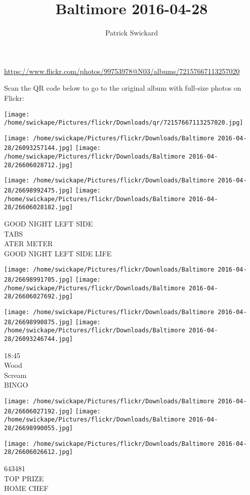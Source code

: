 \documentclass[10pt,letterpaper]{article}
\title{Baltimore 2016-04-28}
\author{Patrick Swickard}
\date{}
\begin{document}
\maketitle

\url{https://www.flickr.com/photos/99753978@N03/albums/72157667113257020}

Scan the QR code below to go to the original album with full-size photos on Flickr:

\texttt{[image: /home/swickape/Pictures/flickr/Downloads/qr/72157667113257020.jpg]}
\pagebreak

\texttt{[image: /home/swickape/Pictures/flickr/Downloads/Baltimore 2016-04-28/26093257144.jpg]}
\texttt{[image: /home/swickape/Pictures/flickr/Downloads/Baltimore 2016-04-28/26606028712.jpg]}

\texttt{[image: /home/swickape/Pictures/flickr/Downloads/Baltimore 2016-04-28/26698992475.jpg]}
\texttt{[image: /home/swickape/Pictures/flickr/Downloads/Baltimore 2016-04-28/26606028182.jpg]}

GOOD NIGHT LEFT SIDE\\
TABS\\
ATER METER\\
GOOD NIGHT LEFT SIDE LIFE
\pagebreak

\texttt{[image: /home/swickape/Pictures/flickr/Downloads/Baltimore 2016-04-28/26698991705.jpg]}
\texttt{[image: /home/swickape/Pictures/flickr/Downloads/Baltimore 2016-04-28/26606027692.jpg]}

\texttt{[image: /home/swickape/Pictures/flickr/Downloads/Baltimore 2016-04-28/26698990875.jpg]}
\texttt{[image: /home/swickape/Pictures/flickr/Downloads/Baltimore 2016-04-28/26093246744.jpg]}

18:45\\
Wood\\
Scream\\
BINGO
\pagebreak

\texttt{[image: /home/swickape/Pictures/flickr/Downloads/Baltimore 2016-04-28/26606027192.jpg]}
\texttt{[image: /home/swickape/Pictures/flickr/Downloads/Baltimore 2016-04-28/26698990055.jpg]}

\texttt{[image: /home/swickape/Pictures/flickr/Downloads/Baltimore 2016-04-28/26606026612.jpg]}

643481\\
TOP PRIZE\\
HOME CHEF
\pagebreak
\end{document}

